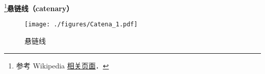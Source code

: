 
\footnote{参考 Wikipedia \href{https://en.wikipedia.org/wiki/Catenary}{相关页面}．}\textbf{悬链线（catenary）}

\begin{figure}[ht]
\centering
\texttt{[image: ./figures/Catena\_1.pdf]}
\caption{悬链线} \label{Catena_fig1}
\end{figure}


